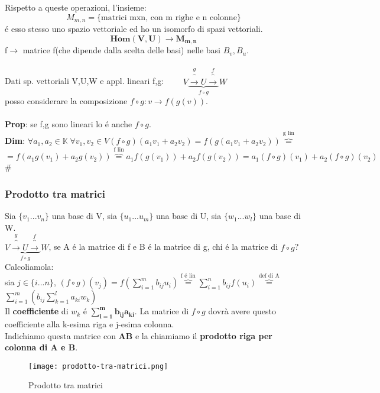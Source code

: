 \documentclass[12pt]{article}
\begin{document}
Rispetto a queste operazioni, l'insieme: 
$$M_{m,n} = \{\text{matrici mxn, con m righe e n colonne\}}$$
é esso stesso uno spazio vettoriale ed ho un isomorfo di spazi vettoriali.\\
$$\boldsymbol{Hom(V,U) \longrightarrow M_{m,n}}$$
f$\longrightarrow$ matrice f(che dipende dalla scelta delle basi) nelle basi $B_v, B_u$.\\\\
Dati sp. vettoriali V,U,W e appl. lineari f,g:    $\quad \quad V\underbrace{\overbrace{\longrightarrow}^{g} U \overbrace{\longrightarrow}^{f}}_{f\circ g} W$\\
posso considerare la composizione $f\circ g:v \longrightarrow f(g(v))$.\\\\
\textbf{Prop}: se f,g sono lineari lo é anche $f \circ g$.\\
\textbf{Dim}: $\forall a_1, a_2 \in \mathbb{K}\; \forall v_1,v_2 \in V (f\circ g)(a_1v_1+a_2v_2) = f(g(a_1v_1+a_2v_2)) \overbrace{=}^{\text{g lin}}$\\
$=f(a_1g(v_1) + a_2g(v_2)) \overbrace{=}^{\text{f lin}} a_1f(g(v_1)) + a_2f(g(v_2)) = a_1(f\circ g)(v_1) + a_2(f\circ g)(v_2)$ \#
\subsubsection{Prodotto tra matrici}
Sia $\{v_1...v_n\}$ una base di V, sia $\{u_1...u_m\}$ una base di U, sia $\{w_1...w_l\}$ una base di W.\\
$V\underbrace{\overbrace{\longrightarrow}^{g} U \overbrace{\longrightarrow}^{f}}_{f\circ g} W$, se A é la matrice di f e B é la matrice di g, chi é la matrice di $f\circ g$? Calcoliamola:\\
sia $j\in \{i...n\}$, $(f\circ g)(v_j) = f(\displaystyle\sum_{i=1}^{m} b_{ij}u_i)  \overbrace{=}^{\text{f é lin}} \displaystyle\sum_{i=1}^n b_{ij}f(u_i)  \overbrace{=}^{\text{def di A}}$
$\displaystyle\sum_{i=1}^{m}(b_{ij}\sum_{k=1}^{l}a_{ki}w_{k})$\\
Il \textbf{coefficiente} di $w_k$ é $\boldsymbol{\displaystyle\sum_{i=1}^{m} b_{ij}a_{ki}}$. La matrice di $f\circ g$ dovrà avere questo coefficiente alla k-esima riga e j-esima colonna.\\
Indichiamo questa matrice con \textbf{AB} e la chiamiamo il \textbf{prodotto riga per colonna di A e B}.
\begin{figure}[h!]
    \centering
    \texttt{[image: prodotto-tra-matrici.png]}
    \caption{Prodotto tra matrici}

\end{figure}\\
\\\\\\\\\\\\
\end{document}
